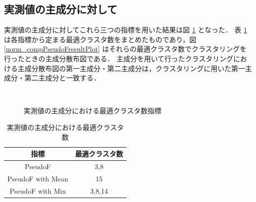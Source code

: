 \documentclass[a4j]{jarticle}
\begin{document}
\newpage
\subsection{実測値の主成分に対して}
実測値の主成分に対してこれら三つの指標を用いた結果は図 \ref{norm_compPseudoF} となった．
表 \ref{norm_compPseudoFresult} は各指標から定まる最適クラスタ数をまとめたものであり，図 \ref{norm_compPseudoFresultPlot} はそれらの最適クラスタ数でクラスタリングを行ったときの主成分散布図である．
主成分を用いて行ったクラスタリングにおける主成分散布図の第一主成分・第二主成分は，クラスタリングに用いた第一主成分・第二主成分と一致する．

\begin{figure}[tb]
\begin{center}
~
~
\caption{実測値の主成分における最適クラスタ数指標}
\label{norm_compPseudoF}
\end{center}
\end{figure}

\begin{table}[tb]
\centering
\caption{実測値の主成分における最適クラスタ数}
\label{norm_compPseudoFresult}
\begin{tabular}{|c|c|}
\hline
指標&最適クラスタ数\\
\hline
PseudoF&3,8\\
\hline
PseudoF with Mean&15\\
\hline
PseudoF with Min&3,8,14\\
\hline
\end{tabular}
\end{table}
\end{document}

